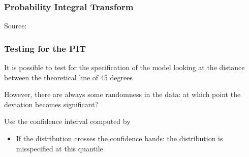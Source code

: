 \documentclass{beamer}
\newenvironment{wideitemize}{\itemize\addtolength{\itemsep}{10pt}}{\enditemize}
\begin{document}
\begin{frame}
  \frametitle{Probability Integral Transform}
  \hspace*{15pt}\hbox{\scriptsize Source:}        
\end{frame}


\begin{frame}
  \frametitle{Testing for the PIT}
  \begin{wideitemize}
    \item It is possible to test for the specification of the model looking at the distance between the theoretical line of 45 degrees
    \item However, there are always some randomness in the data: at which point the deviation becomes significant?
    \item Use the confidence interval computed by \href{https://ideas.repec.org/a/eee/econom/v208y2019i2p638-657.html}{}
      \begin{itemize}
      \item If the distribution crosses the confidence bands: the distribution is misspecified at this quantile
      \end{itemize}    
  \end{wideitemize}
\end{frame}
\end{document}
